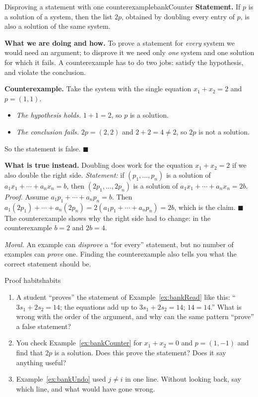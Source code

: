 \documentclass[11pt]{article}
\begin{document}
\begin{exmp}{Disproving a statement with one counterexample}{bankCounter}
\textbf{Statement.} If $p$ is a solution of a system, then the list $2p$, obtained by doubling every entry of $p$, is also a solution of the same system.

\textbf{What we are doing and how.} To prove a statement for \emph{every} system we would need an argument; to disprove it we need only \emph{one} system and one solution for which it fails. A counterexample has to do two jobs: satisfy the hypothesis, and violate the conclusion.

\textbf{Counterexample.} Take the system with the single equation $x_1+x_2=2$ and $p=(1,1)$.
\begin{itemize}
  \item \emph{The hypothesis holds.} $1+1=2$, so $p$ is a solution.
  \item \emph{The conclusion fails.} $2p=(2,2)$ and $2+2=4\neq2$, so $2p$ is not a solution.
\end{itemize}
So the statement is false. \qquad$\blacksquare$

\textbf{What is true instead.} Doubling does work for the equation $x_1+x_2=2$ if we also double the right side. \emph{Statement:} if $(p_1,\dots,p_n)$ is a solution of $a_1x_1+\cdots+a_nx_n=b$, then $(2p_1,\dots,2p_n)$ is a solution of $a_1x_1+\cdots+a_nx_n=2b$. \emph{Proof.} Assume $a_1p_1+\cdots+a_np_n=b$. Then $a_1(2p_1)+\cdots+a_n(2p_n)=2(a_1p_1+\cdots+a_np_n)=2b$, which is the claim. \qquad$\blacksquare$ The counterexample shows why the right side had to change: in the counterexample $b=2$ and $2b=4$.

\emph{Moral.} An example can \emph{disprove} a ``for every'' statement, but no number of examples can \emph{prove} one. Finding the counterexample also tells you what the correct statement should be.
\end{exmp}

\begin{think}{Proof habits}{habits}
\begin{enumerate}[label=(\arabic*)]
  \item A student ``proves'' the statement of Example~\ref{ex:bankRead} like this: ``$3s_1+2s_2=14$; the equations add up to $3s_1+2s_2=14$; $14=14$.'' What is wrong with the order of the argument, and why can the same pattern ``prove'' a false statement?
  \item You check Example~\ref{ex:bankCounter} for $x_1+x_2=0$ and $p=(1,-1)$ and find that $2p$ is a solution. Does this prove the statement? Does it say anything useful?
  \item Example~\ref{ex:bankUndo} used $j\neq i$ in one line. Without looking back, say which line, and what would have gone wrong.
\end{enumerate}
\end{think}
\end{document}
